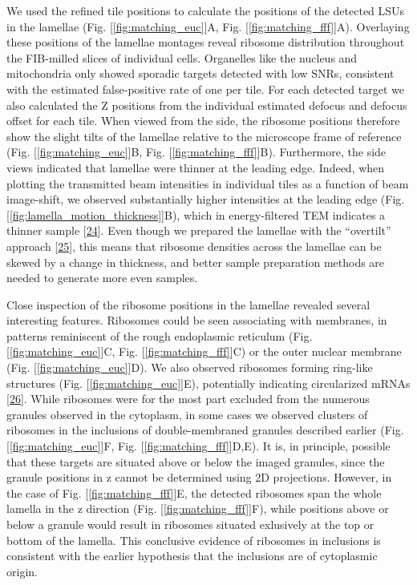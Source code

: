 \documentclass[
]{article}
\begin{document}
We used the refined tile positions to calculate the positions of the detected
LSUs in the lamellae (Fig. {[}\ref{fig:matching_euc}{]}A, Fig. {[}\ref{fig:matching_fff}{]}A). Overlaying these positions of the lamellae montages reveal ribosome
distribution throughout the FIB-milled slices of individual cells. Organelles
like the nucleus and mitochondria only showed sporadic targets detected with low
SNRs, consistent with the estimated false-positive rate of one per tile. For
each detected target we also calculated the Z positions from the individual
estimated defocus and defocus offset for each tile. When viewed from the side,
the ribosome positions therefore show the slight tilts of the lamellae relative
to the microscope frame of reference (Fig. {[}\ref{fig:matching_euc}{]}B, Fig.
{[}\ref{fig:matching_fff}{]}B). Furthermore, the side views indicated that lamellae
were thinner at the leading edge. Indeed, when plotting the transmitted beam
intensities in individual tiles as a function of beam image-shift, we observed
substantially higher intensities at the leading edge (Fig. {[}\ref{fig:lamella_motion_thickness}{]}B), which in energy-filtered
TEM indicates a thinner sample {[}\protect\hyperlink{ref-17IP4Lhz1}{24}{]}. Even though we prepared the lamellae
with the ``overtilt'' approach {[}\protect\hyperlink{ref-hr3dyUeI}{25}{]}, this means that ribosome densities across
the lamellae can be skewed by a change in thickness, and better sample
preparation methods are needed to generate more even samples.

Close inspection of the ribosome positions in the lamellae revealed several
interesting features. Ribosomes could be seen associating with membranes, in
patterns reminiscent of the rough endoplasmic reticulum (Fig.
{[}\ref{fig:matching_euc}{]}C, Fig. {[}\ref{fig:matching_fff}{]}C) or the outer nuclear
membrane (Fig. {[}\ref{fig:matching_euc}{]}D). We also observed ribosomes forming
ring-like structures (Fig. {[}\ref{fig:matching_euc}{]}E), potentially indicating
circularized mRNAs {[}\protect\hyperlink{ref-cie13Q8F}{26}{]}. While ribosomes were for the most part excluded
from the numerous granules observed in the cytoplasm, in some cases we observed
clusters of ribosomes in the inclusions of double-membraned granules
described earlier (Fig. {[}\ref{fig:matching_euc}{]}F, Fig. {[}\ref{fig:matching_fff}{]}D,E). It is, in principle, possible that these targets are situated above or
below the imaged granules, since the granule positions in z cannot be determined
using 2D projections. However, in the case of Fig. {[}\ref{fig:matching_fff}{]}E, the
detected ribosomes span the whole lamella in the z direction (Fig. {[}\ref{fig:matching_fff}{]}F), while positions
above or below a granule would result in ribosomes situated exlusively at the
top or bottom of the lamella. This conclusive evidence of ribosomes in
inclusions is consistent with the earlier hypothesis that the inclusions are of
cytoplasmic origin.
\end{document}
